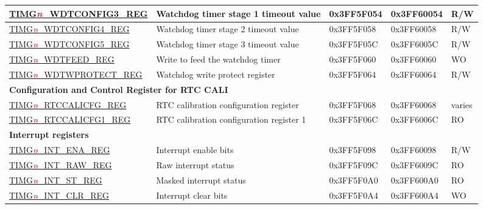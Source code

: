 \begin{longtable}{ | p{5cm} | p{5.6cm} | p{1.8cm} | p{1.8cm} | p{0.8cm} | }
\hyperref[regdesc:TIMERSWDTCONFIG3REG]{TIMG\textcolor{red}{\it{n}}\_WDTCONFIG3\_REG} & Watchdog timer stage 1 timeout value & 0x3FF5F054 & 0x3FF60054 & R/W \\ \hline
\hyperref[regdesc:TIMERSWDTCONFIG4REG]{TIMG\textcolor{red}{\it{n}}\_WDTCONFIG4\_REG} & Watchdog timer stage 2 timeout value & 0x3FF5F058 & 0x3FF60058 & R/W \\ \hline
\hyperref[regdesc:TIMERSWDTCONFIG5REG]{TIMG\textcolor{red}{\it{n}}\_WDTCONFIG5\_REG} & Watchdog timer stage 3 timeout value & 0x3FF5F05C & 0x3FF6005C & R/W \\ \hline
\hyperref[regdesc:TIMERSWDTFEEDREG]{TIMG\textcolor{red}{\it{n}}\_WDTFEED\_REG} & Write to feed the watchdog timer & 0x3FF5F060 & 0x3FF60060 & WO \\ \hline
\hyperref[regdesc:TIMERSWDTWPROTECTREG]{TIMG\textcolor{red}{\it{n}}\_WDTWPROTECT\_REG} & Watchdog write protect register & 0x3FF5F064 & 0x3FF60064 & R/W \\ \hline
\multicolumn{5}{|l|}{\textbf{Configuration and Control Register for RTC CALI}} \\ \hline
\hyperref[regdesc:TIMGRTCCALICFGREG]{TIMG\textcolor{red}{\it{n}}\_RTCCALICFG\_REG} & RTC calibration configuration register & 0x3FF5F068 & 0x3FF60068 & varies \\ \hline
\hyperref[regdesc:TIMGRTCCALICFG1REG]{TIMG\textcolor{red}{\it{n}}\_RTCCALICFG1\_REG} & RTC calibration configuration register 1 & 0x3FF5F06C & 0x3FF6006C & RO \\ \hline
\multicolumn{5}{|l|}{\textbf{Interrupt registers}} \\ \hline
\hyperref[regdesc:TIMERSINTENAREG]{TIMG\textcolor{red}{\it{n}}\_INT\_ENA\_REG} & Interrupt enable bits & 0x3FF5F098 & 0x3FF60098 & R/W \\ \hline
\hyperref[regdesc:TIMERSINTRAWREG]{TIMG\textcolor{red}{\it{n}}\_INT\_RAW\_REG} & Raw interrupt status & 0x3FF5F09C & 0x3FF6009C & RO \\ \hline
\hyperref[regdesc:TIMERSINTSTREG]{TIMG\textcolor{red}{\it{n}}\_INT\_ST\_REG} & Masked interrupt status & 0x3FF5F0A0 & 0x3FF600A0 & RO \\ \hline
\hyperref[regdesc:TIMERSINTCLRREG]{TIMG\textcolor{red}{\it{n}}\_INT\_CLR\_REG} & Interrupt clear bits & 0x3FF5F0A4 & 0x3FF600A4 & WO \\ \hline
\end{longtable}